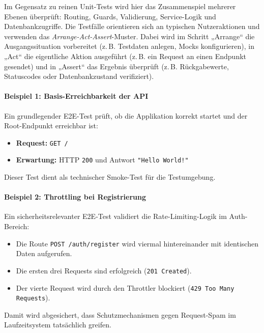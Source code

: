 Im Gegensatz zu reinen Unit-Tests wird hier das Zusammenspiel mehrerer Ebenen überprüft: Routing, Guards, Validierung, Service-Logik und Datenbankzugriffe. Die Testfälle orientieren sich an typischen Nutzeraktionen und verwenden das \textit{Arrange-Act-Assert}-Muster. Dabei wird im Schritt „Arrange“ die Ausgangssituation vorbereitet (z. B. Testdaten anlegen, Mocks konfigurieren), in „Act“ die eigentliche Aktion ausgeführt (z. B. ein Request an einen Endpunkt gesendet) und in „Assert“ das Ergebnis überprüft (z. B. Rückgabewerte, Statuscodes oder Datenbankzustand verifiziert).
\paragraph{Beispiel 1: Basis-Erreichbarkeit der API}
Ein grundlegender E2E-Test prüft, ob die Applikation korrekt startet und der Root-Endpunkt erreichbar ist:
\begin{itemize}
    \item \textbf{Request:} \texttt{GET /}
    \item \textbf{Erwartung:} HTTP \texttt{200} und Antwort \texttt{"Hello World!"}
\end{itemize}
Dieser Test dient als technischer Smoke-Test für die Testumgebung.

\paragraph{Beispiel 2: Throttling bei Registrierung}
Ein sicherheitsrelevanter E2E-Test validiert die Rate-Limiting-Logik im Auth-Bereich:
\begin{itemize}
    \item Die Route \texttt{POST /auth/register} wird viermal hintereinander mit identischen Daten aufgerufen.
    \item Die ersten drei Requests sind erfolgreich (\texttt{201 Created}).
    \item Der vierte Request wird durch den Throttler blockiert (\texttt{429 Too Many Requests}).
\end{itemize}
Damit wird abgesichert, dass Schutzmechanismen gegen Request-Spam im Laufzeitsystem tatsächlich greifen.

